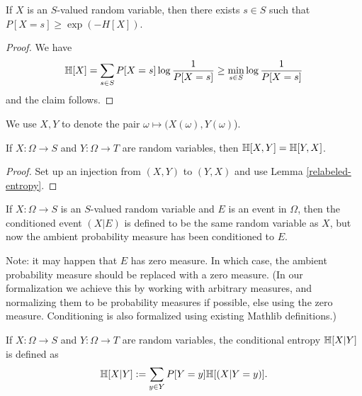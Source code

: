 \begin{lemma}\label{bound-conc}
  \leanok
  If $X$ is an $S$-valued random variable, then there exists $s \in S$ such that $P[X=s] \geq \exp(-H[X])$.
\end{lemma}

\begin{proof}
  We have
  $$ \mathbb{H}[X] = \sum_{s \in S} P[X=s] \log \frac{1}{P[X=s]} \geq \min_{s \in S} \log \frac{1}{P[X=s]}$$
  and the claim follows.
\end{proof}

We use $X,Y$ to denote the pair $\omega \mapsto (X(\omega),Y(\omega)$).

\begin{lemma}
  \label{entropy-comm}
  \leanok
  If $X: \Omega \to S$ and $Y: \Omega \to T$ are random variables, then $\mathbb{H}[X, Y] = \mathbb{H}[Y, X]$.
\end{lemma}
\begin{proof}
  Set up an injection from $(X,Y)$ to $(Y,X)$ and use Lemma \ref{relabeled-entropy}.
\end{proof}


\begin{definition}
  \label{condition-event-def}
  \leanok
  If $X: \Omega \to S$ is an $S$-valued random variable and $E$ is an event in $\Omega$, then the conditioned event $(X|E)$ is defined to be the same random variable as $X$, but now the ambient probability measure has been conditioned to $E$.
\end{definition}

Note: it may happen that $E$ has zero measure.  In which case, the ambient probability measure should be replaced with a zero measure.  (In our formalization we achieve this by working with arbitrary measures, and normalizing them to be probability measures if possible, else using the zero measure.  Conditioning is also formalized using existing Mathlib definitions.)

\begin{definition}
  \label{conditional-entropy-def}
  \leanok
  If $X: \Omega \to S$ and $Y: \Omega \to T$ are random variables, the conditional entropy $\mathbb{H}[X|Y]$ is defined as
  $$ \mathbb{H}[X|Y] := \sum_{y \in Y} P[Y = y] \mathbb{H}[(X | Y=y)].$$
\end{definition}


